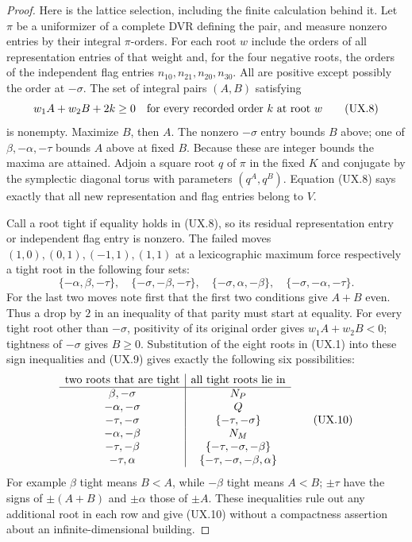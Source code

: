 \begin{proof}
Here is the lattice selection, including the finite
calculation behind it.  Let $\pi$ be a uniformizer of a
complete DVR defining the pair, and measure nonzero
entries by their integral $\pi$-orders.  For each root
$w$ include the orders of all representation entries of
that weight and, for the four negative roots, the orders
of the independent flag entries $n_{10},n_{21},n_{20},n_{30}$.
All are positive except possibly the order at $-\sigma$.
The set of integral pairs $(A,B)$ satisfying
\[
 w_1A+w_2B+2k\ge0
 \quad\hbox{for every recorded order $k$ at root $w$}
 \tag{UX.8}
\]
is nonempty.  Maximize $B$, then $A$.  The nonzero
$-\sigma$ entry bounds $B$ above; one of
$\beta,-\alpha,-\tau$ bounds $A$ above at fixed $B$.
Because these are integer bounds the maxima are attained.
Adjoin a square root $q$ of $\pi$ in the fixed $K$ and
conjugate by the symplectic diagonal torus with parameters
$(q^A,q^B)$.  Equation (UX.8) says exactly that all new
representation and flag entries belong to $V$.

Call a root tight if equality holds in (UX.8), so its
residual representation entry or independent flag entry
is nonzero.  The failed moves $(1,0),(0,1),(-1,1),(1,1)$
at a lexicographic maximum force respectively a tight
root in the following four sets:
\[
 \{-\alpha,\beta,-\tau\},\quad
 \{-\sigma,-\beta,-\tau\},\quad
 \{-\sigma,\alpha,-\beta\},\quad
 \{-\sigma,-\alpha,-\tau\}.
 \tag{UX.9}
\]
For the last two moves note first that the first two
conditions give $A+B$ even.  Thus a drop by $2$ in an
inequality of that parity must start at equality.
For every tight root other than $-\sigma$, positivity
of its original order gives $w_1A+w_2B<0$; tightness
of $-\sigma$ gives $B\ge0$.  Substitution of the eight
roots in (UX.1) into these sign inequalities and (UX.9)
gives exactly the following six possibilities:
\[
\begin{array}{c|c}
 \hbox{two roots that are tight}&\hbox{all tight roots lie in}\\ \hline
 \beta,-\sigma&N_P\\
 -\alpha,-\sigma&Q\\
 -\tau,-\sigma&\{-\tau,-\sigma\}\\
 -\alpha,-\beta&N_M\\
 -\tau,-\beta&\{-\tau,-\sigma,-\beta\}\\
 -\tau,\alpha&\{-\tau,-\sigma,-\beta,\alpha\}
\end{array}
 \tag{UX.10}
\]
For example $\beta$ tight means $B<A$, while
$-\beta$ tight means $A<B$; $\pm\tau$ have the signs
of $\pm(A+B)$ and $\pm\alpha$ those of $\pm A$.
These inequalities rule out any additional root in each
row and give (UX.10) without a compactness assertion about
an infinite-dimensional building.


\end{proof}
